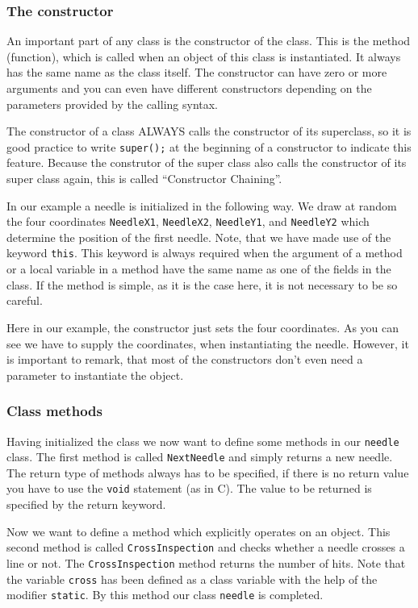 \subsubsection{The constructor}
An important part of any class is the constructor of the class. This is
the method (function), which is called when an object of this
class is instantiated. It always has the same name as the class itself.
The constructor can have zero or more arguments and you can even
have different constructors depending on the parameters provided by
the calling syntax.

The constructor of a class ALWAYS calls the constructor of its
superclass, so it is good practice to write \verb|super();| at the
beginning of a constructor to indicate this feature. Because the 
construtor of the super class also calls the constructor of its super
class again, this is called ``Constructor Chaining''.

In our example a needle is initialized in the following way. We draw
at random the four coordinates \verb|NeedleX1|, \verb|NeedleX2|,
\verb|NeedleY1|, and \verb|NeedleY2| which determine the position of
the first needle. Note, that we have made use of the keyword
\verb|this|.
This keyword is always required when the argument of a method
or a local variable in a method have the same name as one of the fields
in the class. If the method is simple, as it is the case here, it is
not necessary to be so careful.



Here in our example, the constructor just sets the four coordinates. 
As you can see we have to supply the coordinates, when instantiating the
needle. However, it is important to remark, that most of the 
constructors don't even need a parameter to 
instantiate the object. 


\subsubsection{Class methods}
Having initialized the class we now want to define some methods in our
\verb|needle| class. The first  method is called \verb|NextNeedle| and
simply returns a new needle.
The return type of methods always has to be specified, if
there is no return value you have to use the \verb|void| statement
(as in C). The value to be returned is specified by the return keyword.

Now we want to define a method which explicitly operates on an object.
This second method is called \verb|CrossInspection| and checks whether
a needle crosses a line or not. The \verb|CrossInspection| method
returns the number of hits. Note that the variable \verb|cross| has
been defined as a class variable with the help of the modifier \verb|static|.
By this method our class \verb|needle| is completed.


